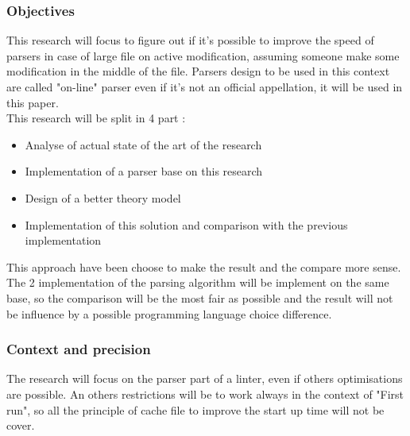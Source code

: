 \subsubsection{Objectives}
This research will focus to figure out if it's possible to improve the speed of parsers in case of large file on active modification, assuming someone make some modification in the middle of the file. Parsers design to be used in this context are called "on-line" parser even if it's not an official appellation, it will be used in this paper.\\

This research will be split in 4 part :
\begin{itemize}
\item Analyse of actual state of the art of the research
\item Implementation of a parser base on this research
\item Design of a better theory model
\item Implementation of this solution and comparison with the previous implementation
\end{itemize}

This approach have been choose to make the result and the compare more sense. The 2 implementation of the parsing algorithm will be implement on the same base, so the comparison will be the most fair as possible and the result will not be influence by a possible programming language choice difference.
\\
\subsubsection{Context and precision}
The research will focus on the parser part of a linter, even if others optimisations are possible.
An others restrictions will be to work always in the context of "First run", so all the principle of cache file to improve the start up time will not be cover.
